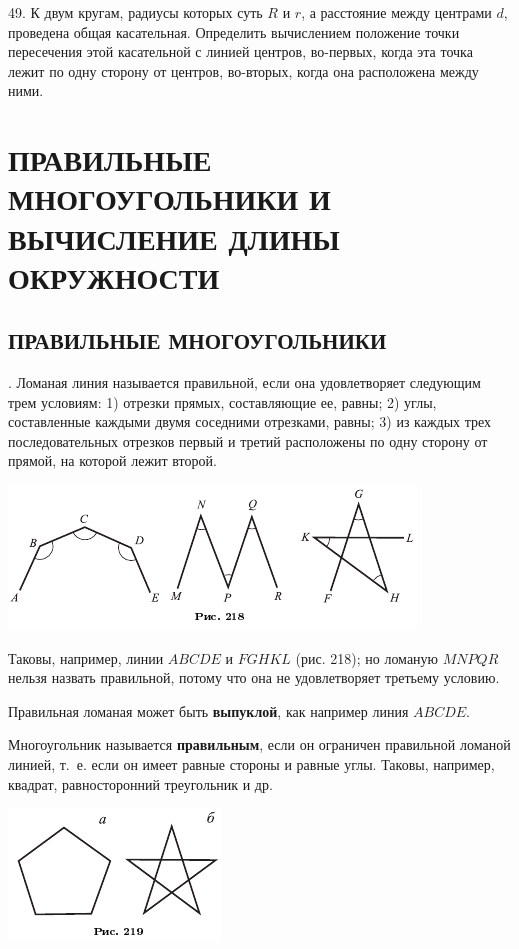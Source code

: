 \documentclass[oneside]{book}
\begin{document}
49.
К двум кругам, радиусы которых суть $R$ и $r$, а расстояние между центрами $d$, проведена общая касательная.
Определить вычислением положение точки пересечения этой касательной с линией центров, во-первых, когда эта точка лежит по одну сторону от центров, во-вторых, когда она расположена между ними.


\chapter[ПРАВИЛЬНЫЕ МНОГОУГОЛЬНИКИ]{ПРАВИЛЬНЫЕ МНОГОУГОЛЬНИКИ И ВЫЧИСЛЕНИЕ ДЛИНЫ ОКРУЖНОСТИ}

\section{ПРАВИЛЬНЫЕ МНОГОУГОЛЬНИКИ}

.
Ломаная линия называется правильной, если она удовлетворяет следующим трем условиям:
1) отрезки прямых, составляющие ее, равны;
2) углы, составленные каждыми двумя соседними отрезками, равны;
3) из каждых трех последовательных отрезков первый и третий расположены по одну сторону от прямой, на которой лежит второй.

\includegraphics{pics/ris-218}


Таковы, например, линии $ABCDE$ и $FGHKL$ (рис. 218);
но ломаную $MNPQR$ нельзя назвать правильной, потому что она не удовлетворяет третьему условию.

Правильная ломаная может быть \textbf{выпуклой}, как например линия $ABCDE$.

Многоугольник называется \textbf{правильным}, если он ограничен правильной ломаной линией, т.~е. если он имеет равные стороны и равные углы.
Таковы, например, квадрат, равносторонний треугольник и др. %

\includegraphics{pics/ris-219}
\end{document}
